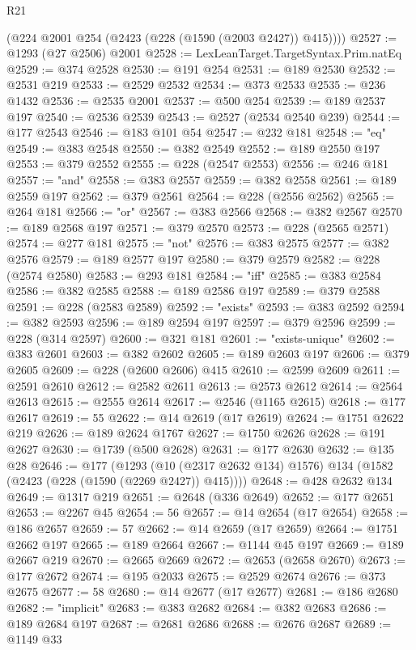 \begin{lexlean}{R21}
\begin{coremodule}
      (@224 @2001 @254 (@2423 (@228 (@1590 (@2003 @2427)) @415))))
@2527 := @1293 (@27 @2506) @2001
@2528 := LexLeanTarget.TargetSyntax.Prim.natEq
@2529 := @374 @2528
@2530 := @191 @254
@2531 := @189 @2530
@2532 := @2531 @219
@2533 := @2529 @2532
@2534 := @373 @2533
@2535 := @236 @1432
@2536 := @2535 @2001
@2537 := @500 @254
@2539 := @189 @2537 @197
@2540 := @2536 @2539
@2543 := @2527 (@2534 @2540 @239)
@2544 := @177 @2543
@2546 := @183 @101 @54
@2547 := @232 @181
@2548 := "eq"
@2549 := @383 @2548
@2550 := @382 @2549
@2552 := @189 @2550 @197
@2553 := @379 @2552
@2555 := @228 (@2547 @2553)
@2556 := @246 @181
@2557 := "and"
@2558 := @383 @2557
@2559 := @382 @2558
@2561 := @189 @2559 @197
@2562 := @379 @2561
@2564 := @228 (@2556 @2562)
@2565 := @264 @181
@2566 := "or"
@2567 := @383 @2566
@2568 := @382 @2567
@2570 := @189 @2568 @197
@2571 := @379 @2570
@2573 := @228 (@2565 @2571)
@2574 := @277 @181
@2575 := "not"
@2576 := @383 @2575
@2577 := @382 @2576
@2579 := @189 @2577 @197
@2580 := @379 @2579
@2582 := @228 (@2574 @2580)
@2583 := @293 @181
@2584 := "iff"
@2585 := @383 @2584
@2586 := @382 @2585
@2588 := @189 @2586 @197
@2589 := @379 @2588
@2591 := @228 (@2583 @2589)
@2592 := "exists"
@2593 := @383 @2592
@2594 := @382 @2593
@2596 := @189 @2594 @197
@2597 := @379 @2596
@2599 := @228 (@314 @2597)
@2600 := @321 @181
@2601 := "exists-unique"
@2602 := @383 @2601
@2603 := @382 @2602
@2605 := @189 @2603 @197
@2606 := @379 @2605
@2609 := @228 (@2600 @2606) @415
@2610 := @2599 @2609
@2611 := @2591 @2610
@2612 := @2582 @2611
@2613 := @2573 @2612
@2614 := @2564 @2613
@2615 := @2555 @2614
@2617 := @2546 (@1165 @2615)
@2618 := @177 @2617
@2619 := 55
@2622 := @14 @2619 (@17 @2619)
@2624 := @1751 @2622 @219
@2626 := @189 @2624 @1767
@2627 := @1750 @2626
@2628 := @191 @2627
@2630 := @1739 (@500 @2628)
@2631 := @177 @2630
@2632 := @135 @28
@2646 := @177
    (@1293 (@10 (@2317 @2632 @134) @1576) @134 (@1582 (@2423 (@228 (@1590 (@2269 @2427)) @415))))
@2648 := @428 @2632 @134
@2649 := @1317 @219
@2651 := @2648 (@336 @2649)
@2652 := @177 @2651
@2653 := @2267 @45
@2654 := 56
@2657 := @14 @2654 (@17 @2654)
@2658 := @186 @2657
@2659 := 57
@2662 := @14 @2659 (@17 @2659)
@2664 := @1751 @2662 @197
@2665 := @189 @2664
@2667 := @1144 @45 @197
@2669 := @189 @2667 @219
@2670 := @2665 @2669
@2672 := @2653 (@2658 @2670)
@2673 := @177 @2672
@2674 := @195 @2033
@2675 := @2529 @2674
@2676 := @373 @2675
@2677 := 58
@2680 := @14 @2677 (@17 @2677)
@2681 := @186 @2680
@2682 := "implicit"
@2683 := @383 @2682
@2684 := @382 @2683
@2686 := @189 @2684 @197
@2687 := @2681 @2686
@2688 := @2676 @2687
@2689 := @1149 @33

\end{coremodule}
\end{lexlean}

